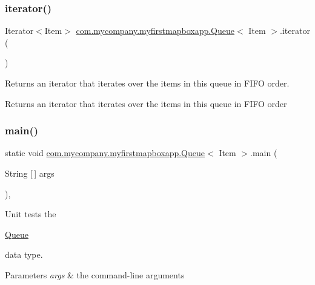 \subsubsection{\texorpdfstring{iterator()}{iterator()}}
{\footnotesize\ttfamily Iterator$<$Item$>$ \hyperlink{classcom_1_1mycompany_1_1myfirstmapboxapp_1_1_queue}{com.\+mycompany.\+myfirstmapboxapp.\+Queue}$<$ Item $>$.iterator (\begin{DoxyParamCaption}{ }\end{DoxyParamCaption})\hspace{0.3cm}{\ttfamily [inline]}}

Returns an iterator that iterates over the items in this queue in F\+I\+FO order.

\begin{DoxyReturn}{Returns}
an iterator that iterates over the items in this queue in F\+I\+FO order 
\end{DoxyReturn}
\mbox{\label{classcom_1_1mycompany_1_1myfirstmapboxapp_1_1_queue_a44b7f4882c64014a729d336896339094}} 
\subsubsection{\texorpdfstring{main()}{main()}}
{\footnotesize\ttfamily static void \hyperlink{classcom_1_1mycompany_1_1myfirstmapboxapp_1_1_queue}{com.\+mycompany.\+myfirstmapboxapp.\+Queue}$<$ Item $>$.main (\begin{DoxyParamCaption}\item[{String \mbox{[}$\,$\mbox{]}}]{args }\end{DoxyParamCaption})\hspace{0.3cm}{\ttfamily [inline]}, {\ttfamily [static]}}

Unit tests the
\begin{DoxyCode}
\hyperlink{classcom_1_1mycompany_1_1myfirstmapboxapp_1_1_queue_a5dd70f04adf8da1736bb5eb94ad0d95b}{Queue} 
\end{DoxyCode}
 data type.


\begin{DoxyParams}{Parameters}
{\em args} & the command-\/line arguments \\
\hline
\end{DoxyParams}
\mbox{\label{classcom_1_1mycompany_1_1myfirstmapboxapp_1_1_queue_a57cba1ae35a323f424eea8e1d194e121}} 
